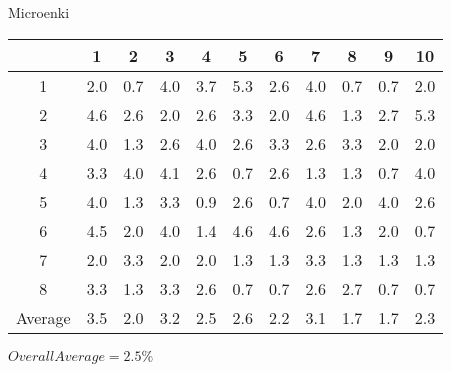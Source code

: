 \begin{center}
    Microenki\\
    \begin{tabular}{ |c|c|c|c|c|c|c|c|c|c|c| }
        \hline
          & 1 & 2 & 3 & 4 & 5 & 6 & 7 & 8 & 9 & 10 \\
        \hline
        \hline
        1 & 2.0 & 0.7 & 4.0 & 3.7 & 5.3 & 2.6 & 4.0 & 0.7 & 0.7 & 2.0 \\
        2 & 4.6 & 2.6 & 2.0 & 2.6 & 3.3 & 2.0 & 4.6 & 1.3 & 2.7 & 5.3 \\
        3 & 4.0 & 1.3 & 2.6 & 4.0 & 2.6 & 3.3 & 2.6 & 3.3 & 2.0 & 2.0 \\
        4 & 3.3 & 4.0 & 4.1 & 2.6 & 0.7 & 2.6 & 1.3 & 1.3 & 0.7 & 4.0 \\
        5 & 4.0 & 1.3 & 3.3 & 0.9 & 2.6 & 0.7 & 4.0 & 2.0 & 4.0 & 2.6 \\
        6 & 4.5 & 2.0 & 4.0 & 1.4 & 4.6 & 4.6 & 2.6 & 1.3 & 2.0 & 0.7 \\
        7 & 2.0 & 3.3 & 2.0 & 2.0 & 1.3 & 1.3 & 3.3 & 1.3 & 1.3 & 1.3 \\
        8 & 3.3 & 1.3 & 3.3 & 2.6 & 0.7 & 0.7 & 2.6 & 2.7 & 0.7 & 0.7 \\
        \hline
        \hline
        Average & 3.5 & 2.0 & 3.2 & 2.5 & 2.6 & 2.2 & 3.1 & 1.7 & 1.7 & 2.3 \\
        \hline
    \end{tabular}
    $ Overall Average = 2.5\% $
\end{center}

